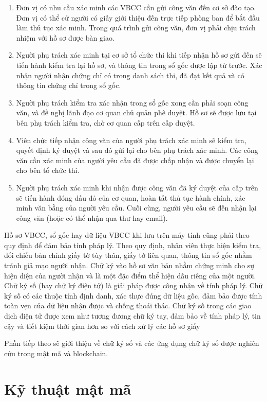 \begin{enumerate}
\item Đơn vị có nhu cầu xác minh các VBCC cần gửi công văn đến cơ sở đào tạo. Đơn vị có thể cử người có giấy giới thiệu đến trực tiếp phòng ban để bắt đầu làm thủ tục xác minh. Trong quá trình gửi công văn, đơn vị phải chịu trách nhiệm với hồ sơ được bàn giao.
\item Người phụ trách xác minh tại cơ sở tổ chức thi khi tiếp nhận hồ sơ gửi đến sẽ tiến hành kiểm tra lại hồ sơ, và thông tin trong sổ gốc được lập từ trước. Xác nhận người nhận chứng chỉ có trong danh sách thi, đã đạt kết quả và có thông tin chứng chỉ trong sổ gốc.
\item Người phụ trách kiểm tra xác nhận trong sổ gốc xong cần phải soạn công văn, và đề nghị lãnh đạo cơ quan chủ quản phê duyệt. Hồ sơ sẽ được lưu tại bên phụ trách kiểm tra, chờ cơ quan cấp trên cấp duyệt.
\item Viên chức tiếp nhận công văn của người phụ trách xác minh sẽ kiểm tra, quyết định ký duyệt và sau đó gửi lại cho bên phụ trách xác minh. Các công văn cần xác minh của người yêu cầu đã được chấp nhận và được chuyển lại cho bên tổ chức thi.
\item Người phụ trách xác minh khi nhận được công văn đã ký duyệt của cấp trên sẽ tiến hành đóng dấu đỏ của cơ quan, hoàn tất thủ tục hành chính, xác minh văn bằng của người yêu cầu. 
Cuối cùng, người yêu cầu sẽ đến nhận lại công văn (hoặc có thể nhận qua thư hay email).
\end{enumerate}

Hồ sơ VBCC, sổ gốc hay dữ liệu VBCC khi lưu trên máy tính cũng phải theo quy định để đảm bảo tính pháp lý.
Theo quy định, nhân viên thực hiện kiểm tra, đối chiếu bản chính giấy tờ tùy thân, giấy tờ liên quan, thông tin sổ gốc nhằm tránh giả mạo người nhận.
Chữ ký vào hồ sơ văn bản nhằm chứng minh cho sự hiện diện của người nhận và là một đặc điểm thể hiện dấu riêng của một người.
Chữ ký số (hay chữ ký điện tử) là giải pháp được công nhận về tính pháp lý. 
Chữ ký số có các thuộc tính định danh, xác thực đúng dữ liệu gốc, đảm bảo được tính toàn vẹn của dữ liệu nhận được và chống thoái thác. 
Chữ ký số trong các giao dịch điện tử được xem như tương đương chữ ký tay, đảm bảo về tính pháp lý, tin cậy và tiết kiệm thời gian hơn so với cách xử lý các hồ sơ giấy

Phần tiếp theo sẽ giới thiệu về chữ ký số và các ứng dụng chữ ký số được nghiên cứu trong mật mã và blockchain.

\section{Kỹ thuật mật mã}

